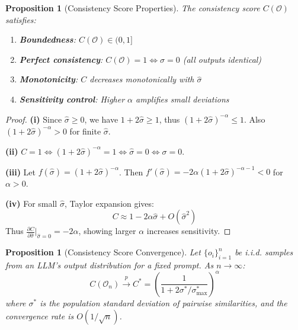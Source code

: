 \documentclass{article}
\newtheorem{proposition}[theorem]{Proposition}
\begin{document}
\begin{proposition}[Consistency Score Properties]
\label{prop:consistency-properties}
The consistency score $C(\mathcal{O})$ satisfies:
\begin{enumerate}
    \item[(i)] \textbf{Boundedness}: $C(\mathcal{O}) \in (0, 1]$
    \item[(ii)] \textbf{Perfect consistency}: $C(\mathcal{O}) = 1 \Leftrightarrow \sigma = 0$ (all outputs identical)
    \item[(iii)] \textbf{Monotonicity}: $C$ decreases monotonically with $\hat{\sigma}$
    \item[(iv)] \textbf{Sensitivity control}: Higher $\alpha$ amplifies small deviations
\end{enumerate}
\end{proposition}

\begin{proof}
\textbf{(i)} Since $\hat{\sigma} \geq 0$, we have $1 + 2\hat{\sigma} \geq 1$, thus $(1 + 2\hat{\sigma})^{-\alpha} \leq 1$. Also $(1 + 2\hat{\sigma})^{-\alpha} > 0$ for finite $\hat{\sigma}$.

\textbf{(ii)} $C = 1 \Leftrightarrow (1 + 2\hat{\sigma})^{-\alpha} = 1 \Leftrightarrow \hat{\sigma} = 0 \Leftrightarrow \sigma = 0$.

\textbf{(iii)} Let $f(\hat{\sigma}) = (1 + 2\hat{\sigma})^{-\alpha}$. Then $f'(\hat{\sigma}) = -2\alpha(1 + 2\hat{\sigma})^{-\alpha-1} < 0$ for $\alpha > 0$.

\textbf{(iv)} For small $\hat{\sigma}$, Taylor expansion gives:
\begin{equation}
    C \approx 1 - 2\alpha\hat{\sigma} + O(\hat{\sigma}^2)
\end{equation}
Thus $\frac{\partial C}{\partial \hat{\sigma}}\big|_{\hat{\sigma}=0} = -2\alpha$, showing larger $\alpha$ increases sensitivity.
\end{proof}

\begin{proposition}[Consistency Score Convergence]
\label{prop:convergence}
Let $\{o_i\}_{i=1}^n$ be i.i.d. samples from an LLM's output distribution for a fixed prompt. As $n \to \infty$:
\begin{equation}
    C(\mathcal{O}_n) \xrightarrow{p} C^* = \left(\frac{1}{1 + 2\sigma^*/\sigma_{\max}^*}\right)^\alpha
\end{equation}
where $\sigma^*$ is the population standard deviation of pairwise similarities, and the convergence rate is $O(1/\sqrt{n})$.
\end{proposition}
\end{document}
